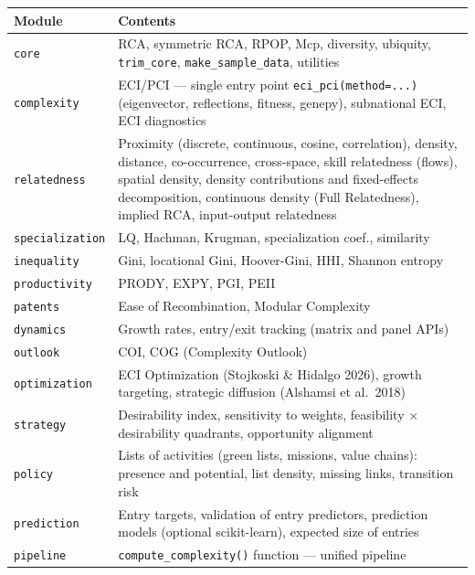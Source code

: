 \documentclass[12pt, a4paper]{article}
\begin{document}
\begin{center}
\begin{tabular}{l>{\raggedright\arraybackslash}p{10cm}}
\toprule
\textbf{Module} & \textbf{Contents} \\
\midrule
\texttt{core}           & RCA, symmetric RCA, RPOP, Mcp, diversity, ubiquity, \texttt{trim\_core},
                          \texttt{make\_sample\_data}, utilities \\
\texttt{complexity}     & ECI/PCI --- single entry point \texttt{eci\_pci(method=...)}
                          (eigenvector, reflections, fitness, genepy), subnational ECI, ECI diagnostics \\
\texttt{relatedness}    & Proximity (discrete, continuous, cosine, correlation),
                          density, distance, co-occurrence, cross-space, skill
                          relatedness (flows), spatial density, density
                          contributions and fixed-effects decomposition, continuous density (Full Relatedness), implied RCA, input-output relatedness \\
\texttt{specialization} & LQ, Hachman, Krugman, specialization coef., similarity \\
\texttt{inequality}     & Gini, locational Gini, Hoover-Gini, HHI, Shannon entropy \\
\texttt{productivity}   & PRODY, EXPY, PGI, PEII \\
\texttt{patents}        & Ease of Recombination, Modular Complexity \\
\texttt{dynamics}       & Growth rates, entry/exit tracking (matrix and panel APIs) \\
\texttt{outlook}        & COI, COG (Complexity Outlook) \\
\texttt{optimization}   & ECI Optimization (Stojkoski \& Hidalgo 2026), growth
                          targeting, strategic diffusion (Alshamsi et al.\ 2018) \\
\texttt{strategy}       & Desirability index, sensitivity to weights,
                          feasibility $\times$ desirability quadrants, opportunity alignment \\
\texttt{policy}         & Lists of activities (green lists, missions, value chains):
                          presence and potential, list density, missing links, transition risk \\
\texttt{prediction}     & Entry targets, validation of entry predictors, prediction
                          models (optional scikit-learn), expected size of entries \\
\texttt{pipeline}       & \texttt{compute\_complexity()} function --- unified pipeline \\
\bottomrule
\end{tabular}
\end{center}
\end{document}
